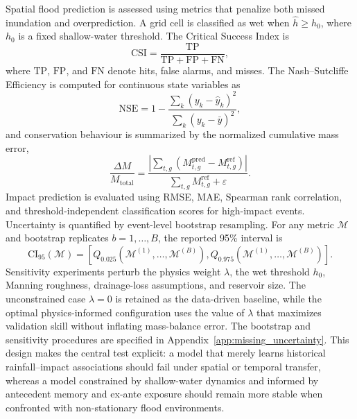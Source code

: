 \documentclass[pdflatex,sn-mathphys-ay]{sn-jnl}
\theoremstyle{thmstyleone}
\theoremstyle{thmstylethree}
\theoremstyle{thmstyletwo}
\begin{document}
Spatial flood prediction is assessed using metrics that penalize both
missed inundation and overprediction.  A grid cell is classified as wet
when $\hat{h}\geq h_{0}$, where $h_{0}$ is a fixed shallow-water
threshold.  The Critical Success Index is
\begin{equation}
  \mathrm{CSI}
  =
  \frac{\mathrm{TP}}
  {\mathrm{TP}+\mathrm{FP}+\mathrm{FN}},
  \label{eq:csi}
\end{equation}
where $\mathrm{TP}$, $\mathrm{FP}$, and $\mathrm{FN}$ denote hits,
false alarms, and misses.  The Nash--Sutcliffe Efficiency is computed
for continuous state variables as
\begin{equation}
  \mathrm{NSE}
  =
  1
  -
  \frac{
    \sum_{k}
    (y_{k}-\hat{y}_{k})^{2}
  }{
    \sum_{k}
    (y_{k}-\bar{y})^{2}
  },
  \label{eq:nse}
\end{equation}
and conservation behaviour is summarized by the normalized cumulative
mass error,
\begin{equation}
  \frac{\Delta M}{M_{\mathrm{total}}}
  =
  \frac{
    \left|
    \sum_{t,g}
    \left(
      M^{\mathrm{pred}}_{t,g}
      -
      M^{\mathrm{ref}}_{t,g}
    \right)
    \right|
  }{
    \sum_{t,g}
    M^{\mathrm{ref}}_{t,g}
    +
    \varepsilon
  }.
  \label{eq:mass_error}
\end{equation}
Impact prediction is evaluated using RMSE, MAE, Spearman rank
correlation, and threshold-independent classification scores for
high-impact events.  Uncertainty is quantified by event-level bootstrap
resampling.  For any metric $\mathcal{M}$ and bootstrap replicates
$b=1,\ldots,B$, the reported 95\% interval is
\begin{equation}
  \mathrm{CI}_{95}(\mathcal{M})
  =
  \left[
    Q_{0.025}
    \left(
      \mathcal{M}^{(1)},\ldots,\mathcal{M}^{(B)}
    \right),
    Q_{0.975}
    \left(
      \mathcal{M}^{(1)},\ldots,\mathcal{M}^{(B)}
    \right)
  \right].
  \label{eq:bootstrap_ci}
\end{equation}
Sensitivity experiments perturb the physics weight $\lambda$, the wet
threshold $h_0$, Manning roughness, drainage-loss assumptions, and
reservoir size.  The unconstrained case $\lambda=0$ is retained as the
data-driven baseline, while the optimal physics-informed configuration
uses the value of $\lambda$ that maximizes validation skill without
inflating mass-balance error.  The bootstrap and sensitivity procedures
are specified in Appendix~\ref{app:missing_uncertainty}.  This design
makes the central test explicit: a model that merely learns historical rainfall--impact
associations should fail under spatial or temporal transfer, whereas a
model constrained by shallow-water dynamics and informed by antecedent
memory and ex-ante exposure should remain more stable when confronted
with non-stationary flood environments.
\end{document}

